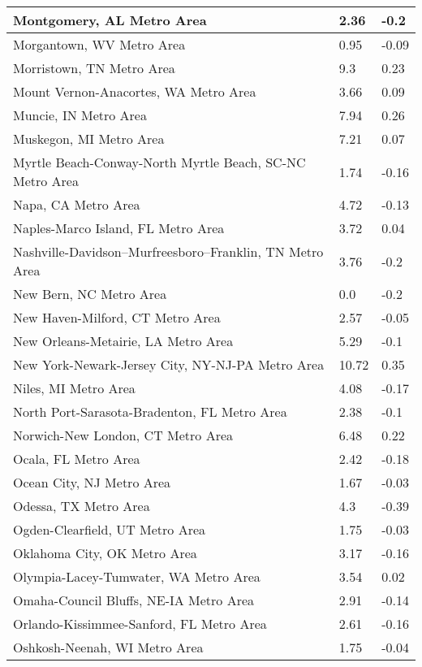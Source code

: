 \documentclass[12pt,oneside, letterpaper]{book}
\begin{document}
\begin{longtable}{| p{} | p{} | p{} |}
    Montgomery, AL Metro Area & 2.36 & -0.2 \\ \hline
    Morgantown, WV Metro Area & 0.95 & -0.09 \\ \hline
    Morristown, TN Metro Area & 9.3 & 0.23 \\ \hline
    Mount Vernon-Anacortes, WA Metro Area & 3.66 & 0.09 \\ \hline
    Muncie, IN Metro Area & 7.94 & 0.26 \\ \hline
    Muskegon, MI Metro Area & 7.21 & 0.07 \\ \hline
    Myrtle Beach-Conway-North Myrtle Beach, SC-NC Metro Area & 1.74 & -0.16 \\ \hline
    Napa, CA Metro Area & 4.72 & -0.13 \\ \hline
    Naples-Marco Island, FL Metro Area & 3.72 & 0.04 \\ \hline
    Nashville-Davidson--Murfreesboro--Franklin, TN Metro Area & 3.76 & -0.2 \\ \hline
    New Bern, NC Metro Area & 0.0 & -0.2 \\ \hline
    New Haven-Milford, CT Metro Area & 2.57 & -0.05 \\ \hline
    New Orleans-Metairie, LA Metro Area & 5.29 & -0.1 \\ \hline
    New York-Newark-Jersey City, NY-NJ-PA Metro Area & 10.72 & 0.35 \\ \hline
    Niles, MI Metro Area & 4.08 & -0.17 \\ \hline
    North Port-Sarasota-Bradenton, FL Metro Area & 2.38 & -0.1 \\ \hline
    Norwich-New London, CT Metro Area & 6.48 & 0.22 \\ \hline
    Ocala, FL Metro Area & 2.42 & -0.18 \\ \hline
    Ocean City, NJ Metro Area & 1.67 & -0.03 \\ \hline
    Odessa, TX Metro Area & 4.3 & -0.39 \\ \hline
    Ogden-Clearfield, UT Metro Area & 1.75 & -0.03 \\ \hline
    Oklahoma City, OK Metro Area & 3.17 & -0.16 \\ \hline
    Olympia-Lacey-Tumwater, WA Metro Area & 3.54 & 0.02 \\ \hline
    Omaha-Council Bluffs, NE-IA Metro Area & 2.91 & -0.14 \\ \hline
    Orlando-Kissimmee-Sanford, FL Metro Area & 2.61 & -0.16 \\ \hline
    Oshkosh-Neenah, WI Metro Area & 1.75 & -0.04 \\ \hline

\end{longtable}
\end{document}

